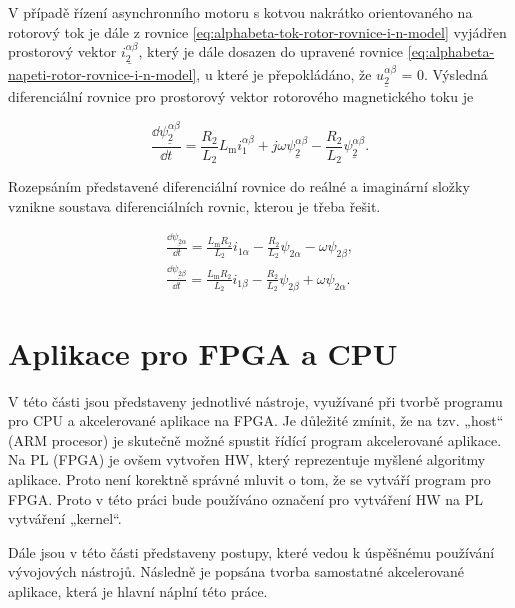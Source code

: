\documentclass[a4paper, twoside, 11pt]{article}
\begin{document}
		V případě řízení asynchronního motoru s kotvou nakrátko orientovaného na rotorový tok je dále z rovnice \ref{eq:alphabeta-tok-rotor-rovnice-i-n-model} vyjádřen prostorový vektor $\underline{i_2^{\alpha \beta}}$, který je dále dosazen do upravené rovnice \ref{eq:alphabeta-napeti-rotor-rovnice-i-n-model}, u které je přepokládáno, že $\underline{u_{2}^{\alpha \beta}}$ = 0.
		Výsledná diferenciální rovnice pro prostorový vektor rotorového magnetického toku je

		\begin{equation}
			\frac{\dd{\underline{\psi_{2}^{\alpha \beta}}}}{\dd{t}} = \frac{R_2}{L_2}L_\text{m} i_1^{\alpha \beta} + j \omega \underline{\psi_2^{\alpha \beta}} - \frac{R_2}{L_2} \underline{\psi_2^{\alpha \beta}}.
		\end{equation}

		Rozepsáním představené diferenciální rovnice do reálné a imaginární složky vznikne soustava diferenciálních rovnic, kterou je třeba řešit.

		\begin{equation}
			\begin{gathered}
				\frac{\dd{\underline{\psi_{2\alpha}}}}{\dd{t}} = \frac{L_\text{m} R_2}{L_2} i_{1\alpha} - \frac{R_2}{L_2} \psi_{2\alpha} - \omega \psi_{2\beta},\\\frac{\dd{\underline{\psi_{2\beta}}}}{\dd{t}} = \frac{L_\text{m} R_2}{L_2} i_{1\beta} - \frac{R_2}{L_2} \psi_{2\beta} + \omega \psi_{2\alpha}.
			\end{gathered}
		\end{equation}


\section{Aplikace pro FPGA a CPU}
V této části jsou představeny jednotlivé nástroje, využívané při tvorbě programu pro CPU a akcelerované aplikace na FPGA. Je důležité zmínit, že na tzv. „host“ (ARM procesor) je skutečně možné spustit řídící program akcelerované aplikace. Na PL (FPGA) je ovšem vytvořen HW, který reprezentuje myšlené algoritmy aplikace. Proto není korektně správné mluvit o tom, že se vytváří program pro FPGA. Proto v této práci bude používáno označení pro vytváření HW na PL vytváření „kernel“.\par
	Dále jsou v této části představeny postupy, které vedou k úspěšnému používání vývojových nástrojů. Následně je popsána tvorba samostatné akcelerované aplikace, která je hlavní náplní této práce.
\end{document}
